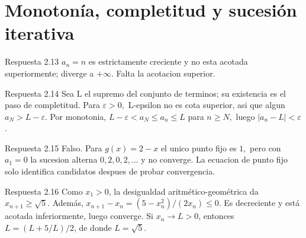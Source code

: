 \documentclass[10pt,a4paper,oneside,openany]{book}
\begin{document}
\section{Monotonía, completitud y sucesión iterativa}
\begin{PSevenAnswerFixed}{Respuesta 2.13}
\(a_n=n\) es estrictamente creciente y no esta acotada superiormente; diverge a \(+\infty \). Falta la acotacion superior.
\end{PSevenAnswerFixed}
\begin{PSevenAnswerFixed}{Respuesta 2.14}
Sea L el supremo del conjunto de terminos; su existencia es el paso de completitud. Para \(\varepsilon >0,\) L-epsilon no es cota superior, asi que algun \(a_N>L-\varepsilon \). Por monotonia, \(L-\varepsilon <a_N\le a_n\le L\) para \(n\ge N,\) luego \(|a_n-L|<\varepsilon \).
\end{PSevenAnswerFixed}
\begin{PSevenAnswerFixed}{Respuesta 2.15}
Falso. Para \(g(x)=2-x\) el unico punto fijo es \(1,\) pero con \(a_1=0\) la sucesion alterna \(0,2,0,2,..\). y no converge. La ecuacion de punto fijo solo identifica candidatos despues de probar convergencia.
\end{PSevenAnswerFixed}
\begin{PSevenAnswerFixed}{Respuesta 2.16}
Como \(x_1>0\), la desigualdad aritmético-geométrica da \(x_{n+1}\ge\sqrt5\). Además, \(x_{n+1}-x_n=(5-x_n^2)/(2x_n)\le0\). Es decreciente y está acotada inferiormente, luego converge. Si \(x_n\to L>0\), entonces \(L=(L+5/L)/2\), de donde \(L=\sqrt5\).
\end{PSevenAnswerFixed}
\end{document}
